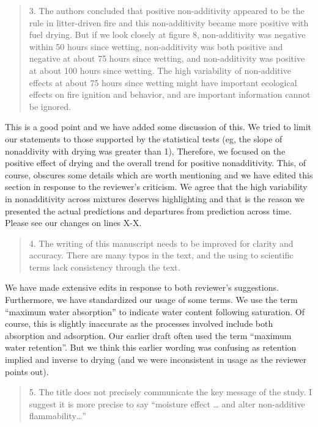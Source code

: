 \documentclass[letterpaper, 12pt]{letter}
\begin{document}
\begin{letter}{}
\begin{quote}
  3. The authors concluded that positive non-additivity appeared to be the rule
  in litter-driven fire and this non-additivity became more positive with fuel
  drying. But if we look closely at figure 8, non-additivity was negative
  within 50 hours since wetting, non-additivity was both positive and negative
  at about 75 hours since wetting, and non-additivity was positive at about 100
  hours since wetting. The high variability of non-additive effects at about 75
  hours since wetting might have important ecological effects on fire ignition
  and behavior, and are important information cannot be ignored.
\end{quote}

This is a good point and we have added some discussion of this. We tried to
limit our statements to those supported by the statistical tests (eg, the slope of
nonaddivity with drying was greater than 1), Therefore, we focused on the
positive effect of drying and the overall trend for positive nonadditivity.
This, of course, obscures some details which are worth mentioning and we have
edited this section in response to the reviewer's criticism. We agree that the
high variability in nonadditivity across mixtures deserves highlighting and
that is the reason we presented the actual predictions and departures from
prediction across time. Please see our changes on lines X-X.


\begin{quote}
  4. The writing of this manuscript needs to be improved for clarity and
  accuracy. There are many typos in the text, and the using to scientific terms
  lack consistency through the text.
\end{quote}

We have made extensive edits in response to both reviewer's suggestions.
Furthermore, we have standardized our usage of some terms. We use the term
``maximum water absorption'' to indicate water content following saturation. Of
course, this is slightly inaccurate as the processes involved include both
absorption and adsorption. Our earlier draft often used the term ``maximum
water retention''. But we think this earlier wording was confusing as retention
implied and inverse to drying (and we were inconsistent in usage as the
reviewer points out).

\begin{quote}
  5. The title does not precisely communicate the key message of the study. I
  suggest it is more precise to say “moisture effect … and alter non-additive
  flammability…”
\end{quote}


\end{letter}
\end{document}

